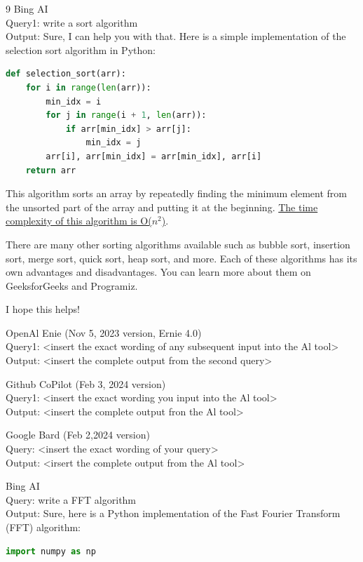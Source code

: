 \documentclass{mcmthesis}
\begin{document}
\begin{ReportAiUse}{9}
Bing AI\\
Query1: write a sort algorithm\\
Output: Sure, I can help you with that. Here is a simple implementation of the selection sort algorithm in Python:
\begin{lstlisting}[language=python]
def selection_sort(arr):
    for i in range(len(arr)):
        min_idx = i
        for j in range(i + 1, len(arr)):
            if arr[min_idx] > arr[j]:
                min_idx = j
        arr[i], arr[min_idx] = arr[min_idx], arr[i]
    return arr
\end{lstlisting}
This algorithm sorts an array by repeatedly finding the minimum element from the unsorted part of the array and putting it at the beginning. \href{https://www.geeksforgeeks.org/sorting-algorithms/}{The time complexity of this algorithm is O($n^2$)}.

There are many other sorting algorithms available such as bubble sort, insertion sort, merge sort, quick sort, heap sort, and more. Each of these algorithms has its own advantages and disadvantages. You can learn more about them on GeeksforGeeks and Programiz.

I hope this helps!

OpenAl Enie (Nov 5, 2023 version, Ernie 4.0)\\
Query1: <insert the exact wording of any subsequent input into the Al tool>\\
Output: <insert the complete output from the second query>

Github CoPilot (Feb 3, 2024 version)\\
Query1: <insert the exact wording you input into the Al tool>\\
Output: <insert the complete output fron the Al tool>

Google Bard (Feb 2,2024 version)\\
Query: <insert the exact wording of your query>\\
Output: <irsert the complete output from the Al tool>

Bing AI\\
Query: write a FFT algorithm\\
Output: Sure, here is a Python implementation of the Fast Fourier Transform (FFT) algorithm:
\begin{lstlisting}[language=python]
import numpy as np


\end{lstlisting}
\end{ReportAiUse}
\end{document}
